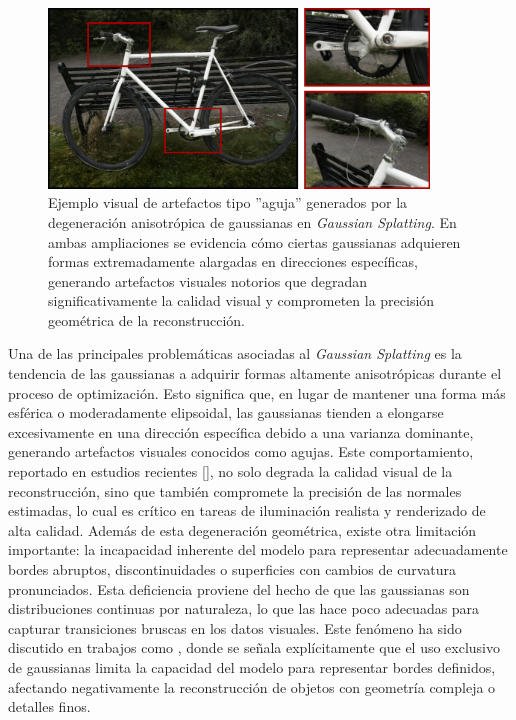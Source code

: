 \begin{figure}[htbp]
    \centering
    \includegraphics[width=0.9\textwidth]{Graphics/bici.jpg}
    \caption{Ejemplo visual de artefactos tipo ''aguja'' generados por la degeneración anisotrópica de gaussianas en \textit{Gaussian Splatting}. 
    En ambas ampliaciones se evidencia cómo ciertas 
    gaussianas adquieren formas extremadamente alargadas en direcciones específicas, generando artefactos visuales notorios que degradan 
    significativamente la calidad visual y comprometen la precisión geométrica de la reconstrucción.}
    \label{fig:bici}
\end{figure}

Una de las principales problemáticas asociadas al \textit{Gaussian Splatting} es la tendencia de las gaussianas a adquirir formas altamente anisotrópicas 
durante el proceso de optimización. Esto significa que, en lugar de mantener una forma más esférica o moderadamente elipsoidal, las gaussianas 
tienden a elongarse excesivamente en una dirección específica debido a una varianza dominante, generando artefactos visuales conocidos como agujas. 
Este comportamiento, reportado en estudios recientes  [\cite{hyung2024effectiverankanalysisregularization, huang2024spectralgstaming3dgaussian, yu2023mipsplattingaliasfree3dgaussian}],
no solo degrada la calidad visual de la reconstrucción, sino que también compromete la precisión de las normales estimadas, lo cual es crítico 
en tareas de iluminación realista y renderizado de alta calidad.
Además de esta degeneración geométrica, existe otra limitación importante: la incapacidad inherente del modelo para representar adecuadamente 
bordes abruptos, discontinuidades o superficies con cambios de curvatura pronunciados. Esta deficiencia proviene del hecho de que las gaussianas 
son distribuciones continuas por naturaleza, lo que las hace poco adecuadas para capturar transiciones bruscas en los datos visuales. Este fenómeno 
ha sido discutido en trabajos como \cite{qu2024discgsdiscontinuityawaregaussiansplatting}, donde se señala explícitamente que el 
uso exclusivo de gaussianas limita la capacidad del modelo para representar bordes definidos, afectando negativamente la reconstrucción 
de objetos con geometría compleja o detalles finos.

